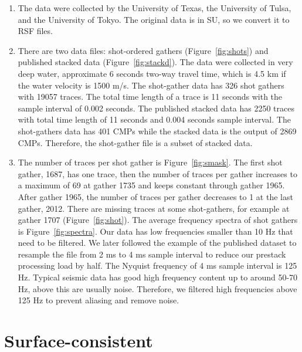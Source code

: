 \begin{enumerate}
\item The data were collected by the University of Texas, the University of Tulsa, and the University of Tokyo. The original data is in SU, so we convert it to RSF files.
\item There are two data files: shot-ordered gathers (Figure~\ref{fig:shots}) and published stacked data (Figure~\ref{fig:stackd}). The data were collected in very deep water, approximate 6 seconds two-way travel time, which is 4.5 km if the water velocity is 1500 m/s. The shot-gather data has 326 shot gathers with 19057 traces. The total time length of a trace is 11 seconds with the sample interval of 0.002 seconds. The published stacked data has 2250 traces with total time length of 11 seconds and 0.004 seconds sample interval. The shot-gathers data has 401 CMPs while the stacked data is the output of 2869 CMPs. Therefore, the shot-gather file is a subset of stacked data.  
\item The number of traces per shot gather is Figure~\ref{fig:smask}. The first shot gather, 1687, has one trace, then the number of traces per gather increases to a maximum of 69 at gather 1735 and keeps constant through gather 1965. After gather 1965, the number of traces per gather decreases to 1 at the last gather, 2012. There are missing traces at some shot-gathers, for example at gather 1707 (Figure~\ref{fig:shot}). The average frequency spectra of shot gathers is Figure~\ref{fig:spectra}. Our data has low frequencies smaller than 10 Hz that need to be filtered. We later followed the example of the published dataset to resample the file from 2 ms to 4 ms sample interval to reduce our prestack processing load by half. The Nyquist frequency of 4 ms sample interval is 125 Hz. Typical seismic data has good high frequency content up to around 50-70 Hz, above this are usually noise. Therefore, we filtered high frequencies above 125 Hz to prevent aliasing and remove noise.    


\end{enumerate}

\section{Surface-consistent}

